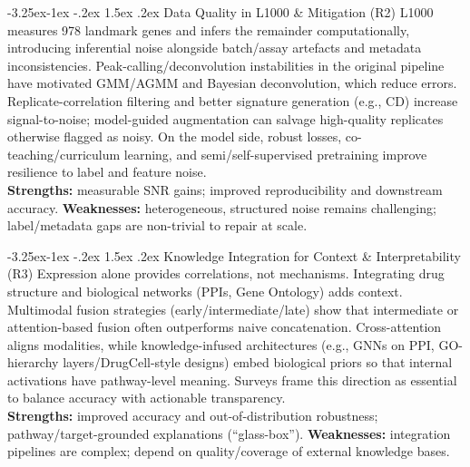 \documentclass[12pt,a4paper]{article}
\makeatletter
\renewcommand\subsection{\@startsection{subsection}{2}{\z@}%
  {-3.25ex\@plus-1ex \@minus-.2ex}%
  {1.5ex \@plus.2ex}%
  {\normalfont\normalsize\bfseries}}
\makeatother
\begin{document}
\subsection{Data Quality in L1000 \& Mitigation (R2)}
L1000 measures 978 landmark genes and infers the remainder computationally, introducing inferential noise alongside batch/assay artefacts and metadata inconsistencies\cite{subramanian2017next,mcdermott2019deep}. Peak-calling/deconvolution instabilities in the original pipeline have motivated GMM/AGMM and Bayesian deconvolution, which reduce errors\cite{qiu2020bayesian}. Replicate-correlation filtering and better signature generation (e.g., CD) increase signal-to-noise; model-guided augmentation can salvage high-quality replicates otherwise flagged as noisy\cite{szalai2019signatures,duan2016l1000cds2,pham2021deep}. On the model side, robust losses, co-teaching/curriculum learning, and semi/self-supervised pretraining improve resilience to label and feature noise.\\
\textbf{Strengths:} measurable SNR gains; improved reproducibility and downstream accuracy.
\textbf{Weaknesses:} heterogeneous, structured noise remains challenging; label/metadata gaps are non-trivial to repair at scale.

\subsection{Knowledge Integration for Context \& Interpretability (R3)}
Expression alone provides correlations, not mechanisms. Integrating drug structure and biological networks (PPIs, Gene Ontology) adds context\cite{liu2015compound}. Multimodal fusion strategies (early/intermediate/late) show that intermediate or attention-based fusion often outperforms naive concatenation\cite{stahlschmidt2022multimodal}. Cross-attention aligns modalities, while knowledge-infused architectures (e.g., GNNs on PPI, GO-hierarchy layers/DrugCell-style designs) embed biological priors so that internal activations have pathway-level meaning\cite{elabd2024simple,mcdermott2019deep,samal2022opportunities}. Surveys frame this direction as essential to balance accuracy with actionable transparency\cite{chow2022predicting}.\\
\textbf{Strengths:} improved accuracy and out-of-distribution robustness; pathway/target-grounded explanations (“glass-box”).
\textbf{Weaknesses:} integration pipelines are complex; depend on quality/coverage of external knowledge bases.
\\ \\
\end{document}
